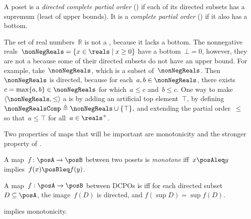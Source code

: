 \begin{definition}[Completeness]
\label{def:cpo}A poset is a \emph{directed complete partial order}
(\DCPO) if each of its directed subsets has a supremum (least of
upper bounds). It is a \emph{complete partial order} (\CPO) if it
also has a bottom.

\end{definition}
\begin{example}
\label{exa:Rcomp}The set of real numbers~$\mathbb{R}$ is not
a \CPO, because it lacks a bottom. The nonnegative reals~$\nonNegReals=\{x\in\reals\mid x\geq0\}$
have a bottom~$\bot=0$, however, they are not a \DCPO because some
of their directed subsets do not have an upper bound. For example,
take~$\nonNegReals$, which is a subset of~$\nonNegReals$. Then~$\nonNegReals$
is directed, because for each~$a,b\in\nonNegReals$, there exists~$c=\max\{a,b\}\in\nonNegReals$
for which~$a\leq c$ and~$b\leq c$. One way to make~$\left\langle \nonNegReals,\leq\right\rangle $
a \CPO is by adding an artificial top element~$\top$, by defining~$\nonNegRealsComp\triangleq\nonNegReals\cup\{\top\},$
and extending the partial order~$\leq$ so that~$a\leq\top$ for
all~$a\in\reals^{+}$.
\end{example}

Two properties of maps that will be important are monotonicity and
the stronger property of \scottcontinuity.
\begin{definition}[Monotonicity]
\label{def:monotone}A map~$f\colon\posA\rightarrow\posB$ between
two posets is \emph{monotone} iff~$x\posAleq y$ implies~$f(x)\posBleq f(y)$.
\end{definition}

\begin{definition}[\scottcontinuity]
\label{def:scott}A map~$f:\posA\rightarrow\posB$ between DCPOs
is\textbf{ }\emph{\scottcontinuous{}}\textbf{ }iff for each directed
subset~$D\subseteq\posA$, the image~$f(D)$ is directed, and $f(\sup D)=\sup f(D).$
\end{definition}
\begin{remark}
\scottcontinuity implies monotonicity.
\end{remark}

